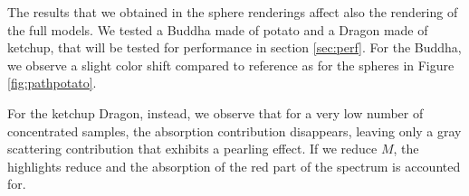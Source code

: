 The results that we obtained in the sphere renderings affect also the rendering of the full models. We tested a Buddha made of potato and a Dragon made of ketchup, that will be tested for performance in section \ref{sec:perf}. For the Buddha, we observe a slight color shift compared to reference as for the spheres in Figure \ref{fig:pathpotato}.

For the ketchup Dragon, instead, we observe that for a very low number of concentrated samples, the absorption contribution disappears, leaving only a gray scattering contribution that exhibits a pearling effect. If we reduce $M$, the highlights reduce and the absorption of the red part of the spectrum is accounted for.

\begin{figure}
\centering
{}
\end{figure}
